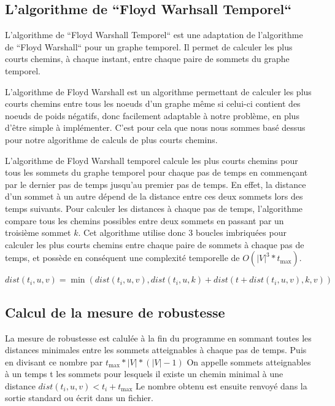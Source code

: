 \subsection{L'algorithme de ``Floyd Warhsall Temporel``}
L'algorithme de ``Floyd Warshall Temporel`` est une adaptation de l'algorithme de ``Floyd Warshall``\cite{hougardy2010floyd} pour un graphe temporel. 
Il permet de calculer les plus courts chemins, à chaque instant, entre chaque paire de sommets du graphe temporel.

L'algorithme de Floyd Warshall est un algorithme permettant de calculer les plus courts chemins entre tous les noeuds d'un graphe 
même si celui-ci contient des noeuds de poids négatifs, donc facilement adaptable à notre problème, en plus d'être simple à implémenter.
C'est pour cela que nous nous sommes basé dessus pour notre algorithme de calculs de plus courts chemins. 

L'algorithme de Floyd Warshall temporel calcule les plus courts chemins pour tous les sommets du graphe temporel 
pour chaque pas de temps en commençant par le dernier pas de temps jusqu'au premier pas de temps.
En effet, la distance d'un sommet à un autre dépend de la distance entre ces deux sommets lors des temps suivants. 
Pour calculer les distances à chaque pas de temps, l'algorithme compare 
tous les chemins possibles entre deux sommets en passant par un troisième sommet $k$. 
Cet algorithme utilise donc 3 boucles imbriquées pour calculer les plus courts chemins entre chaque paire de sommets à chaque pas de temps, 
et possède en conséquent une complexité temporelle de $O(|V|^3*t_{\max})$.\label{subsec:algo_floyd_warshall_temporel}

\begin{equation}
    dist(t_{i},u,v) = \min(dist(t_{i},u,v), dist(t_{i},u,k) + dist(t + dist(t_{i},u,v), k,v))
\end{equation}

\subsection{Calcul de la mesure de robustesse}
La mesure de robustesse est calulée à la fin du programme en sommant toutes 
les distances minimales entre les sommets atteignables à chaque pas de temps. 
Puis en divisant ce nombre par $t_{\max} * |V| * (|V| - 1)$
On appelle sommets atteignables à un temps t les sommets pour lesquels il existe un chemin 
minimal à une distance 
$dist(t_{i},u,v) < t_{i} + t_{\max}$
Le nombre obtenu est ensuite renvoyé dans la sortie standard ou écrit dans un fichier.
